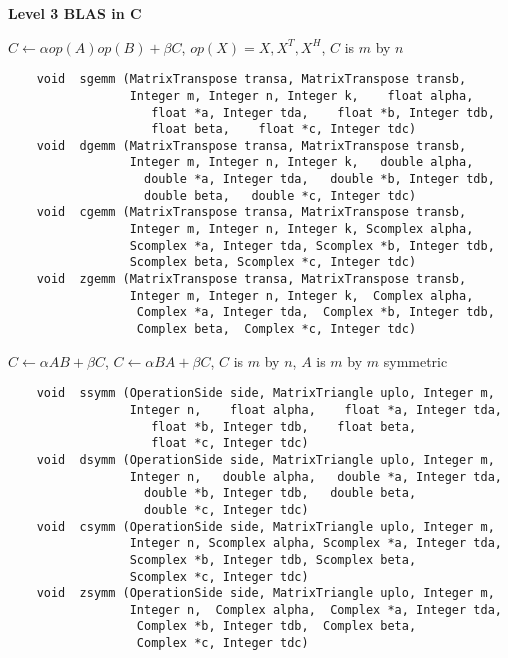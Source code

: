 \newpage
\noindent
{\large {\bf Level 3 BLAS in C}}

\vspace{.5cm}
\noindent
$C \leftarrow \alpha op(A) op(B) + \beta C$, $op(X) = X,X^T,X^H$,
$C$ is $m$ by $n$
\footnotesize
\begin{verbatim}
    void  sgemm (MatrixTranspose transa, MatrixTranspose transb,
                 Integer m, Integer n, Integer k,    float alpha,
                    float *a, Integer tda,    float *b, Integer tdb,
                    float beta,    float *c, Integer tdc)
    void  dgemm (MatrixTranspose transa, MatrixTranspose transb,
                 Integer m, Integer n, Integer k,   double alpha,
                   double *a, Integer tda,   double *b, Integer tdb,
                   double beta,   double *c, Integer tdc)
    void  cgemm (MatrixTranspose transa, MatrixTranspose transb,
                 Integer m, Integer n, Integer k, Scomplex alpha,
                 Scomplex *a, Integer tda, Scomplex *b, Integer tdb,
                 Scomplex beta, Scomplex *c, Integer tdc)
    void  zgemm (MatrixTranspose transa, MatrixTranspose transb,
                 Integer m, Integer n, Integer k,  Complex alpha,
                  Complex *a, Integer tda,  Complex *b, Integer tdb,
                  Complex beta,  Complex *c, Integer tdc)
\end{verbatim}
\normalsize
$C \leftarrow \alpha AB + \beta C$, $C \leftarrow \alpha BA + \beta C$,
$C$ is $m$ by $n$, $A$ is $m$ by $m$ symmetric
\footnotesize
\begin{verbatim}
    void  ssymm (OperationSide side, MatrixTriangle uplo, Integer m,
                 Integer n,    float alpha,    float *a, Integer tda,
                    float *b, Integer tdb,    float beta,
                    float *c, Integer tdc)
    void  dsymm (OperationSide side, MatrixTriangle uplo, Integer m,
                 Integer n,   double alpha,   double *a, Integer tda,
                   double *b, Integer tdb,   double beta,
                   double *c, Integer tdc)
    void  csymm (OperationSide side, MatrixTriangle uplo, Integer m,
                 Integer n, Scomplex alpha, Scomplex *a, Integer tda,
                 Scomplex *b, Integer tdb, Scomplex beta,
                 Scomplex *c, Integer tdc)
    void  zsymm (OperationSide side, MatrixTriangle uplo, Integer m,
                 Integer n,  Complex alpha,  Complex *a, Integer tda,
                  Complex *b, Integer tdb,  Complex beta,
                  Complex *c, Integer tdc)
\end{verbatim}
